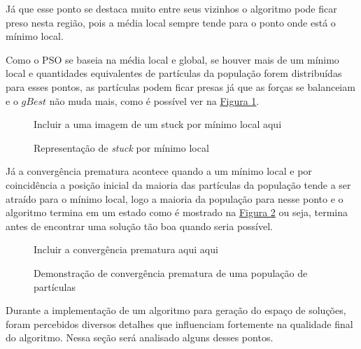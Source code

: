            Já que esse ponto se destaca muito entre seus vizinhos o algoritmo pode ficar preso nesta região, pois a média local sempre tende para o ponto onde está o mínimo local.\hfill\vspace{\onelineskip}

            Como o PSO se baseia na média local e global, se houver mais de um mínimo local e quantidades equivalentes de partículas da população forem distribuídas para esses pontos, as partículas podem ficar presas já que as forças se balanceiam e o $gBest$ não muda mais, como é possível ver na \hyperref[fig:stuck-por-minimolocal]{Figura \ref{fig:stuck-por-minimolocal}}.\hfill
            
            \begin{figure}[ht]
                \centering
                \small{Incluir a uma imagem de um stuck por mínimo local aqui}
                \caption{Representação de \textit{stuck} por mínimo local}
                \label{fig:stuck-por-minimolocal}
            \end{figure}
            
            
            Já a convergência prematura acontece quando a um mínimo local e por coincidência a posição inicial da maioria das partículas da população tende a ser atraído para o mínimo local, logo a maioria da população para nesse ponto e o algoritmo termina em um estado como é mostrado na 
            \hyperref[fig:convergencia-prematura]{Figura \ref{fig:convergencia-prematura}} 
            ou seja, termina antes de encontrar uma solução tão boa quando seria possível.\hfill

            \begin{figure}[ht]
                \centering
                \small{Incluir a convergência prematura aqui aqui}
                \caption{Demonstração de convergência prematura de uma população de partículas}
                \label{fig:convergencia-prematura}
            \end{figure}
            
        

            Durante a implementação de um algoritmo para geração do espaço de soluções, foram percebidos diversos detalhes que influenciam fortemente na qualidade final do algoritmo. Nessa seção será analisado alguns desses pontos.\\


